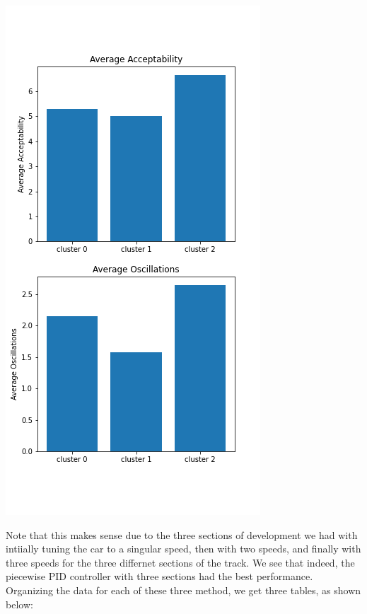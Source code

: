 \documentclass[12pt]{article}
\begin{document}
\begin{multicols}{2}
\begin{center}
\includegraphics*[scale=0.3]{KpKiAllTSNEKMeansAverage.png}
\end{center}
Note that this makes sense due to the three sections of development we had with intiially tuning the car to a singular speed, then with two speeds, and 
finally with three speeds for the three differnet sections of the track. We see that indeed, the piecewise PID controller with three sections had the best performance.
Organizing the data for each of these three method, we get three tables, as shown below:
\begin{center}

\end{center}
\end{multicols}
\end{document}
